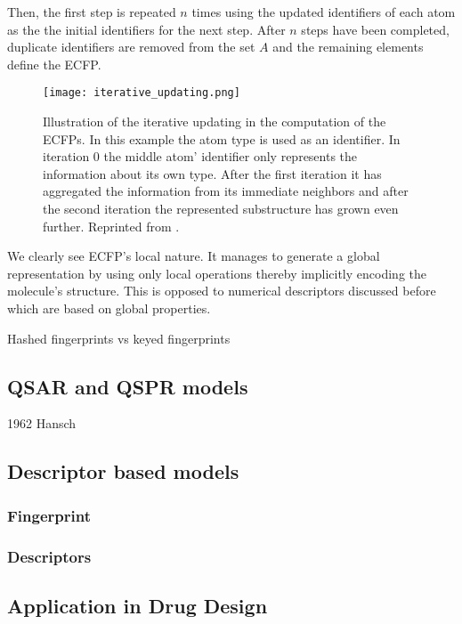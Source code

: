 Then, the first step is repeated $n$ times using the updated identifiers of each atom as the the initial identifiers for the next step. After $n$ steps have been completed, duplicate identifiers are removed from the set $A$ and the remaining elements define the ECFP.
\begin{figure}[h]
	\centering 
	\texttt{[image: iterative\_updating.png]}
	\caption{Illustration of the iterative updating in the computation of the ECFPs. In this example the atom type is used as an identifier. In iteration 0 the middle atom' identifier only represents the information about its own type. After the first iteration it has aggregated the information from its immediate neighbors and after the second iteration the represented substructure has grown even further. Reprinted from \cite{ECFP}. }
\end{figure}
We clearly see ECFP's local nature. It manages to generate a global representation by using only local operations thereby implicitly encoding the molecule's structure. This is opposed to numerical descriptors discussed before which are based on global properties. 

Hashed fingerprints vs keyed fingerprints

\subsection{QSAR and QSPR models}
1962 Hansch
\subsection{Descriptor based models}
\subsubsection{Fingerprint}

\subsubsection{Descriptors}

\subsection{Application in Drug Design}